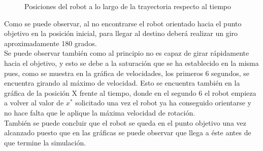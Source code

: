 \documentclass[a4paper,twoside]{article}
\begin{document}
\begin{itemize}
\begin{figure}[h!]
		\caption{Posiciones del robot a lo largo de la trayectoria respecto al tiempo}
		\end{figure}
\newpage
		Como se puede observar, al no encontrarse el robot orientado hacia el punto objetivo en la posición inicial, para llegar al destino deberá realizar un giro aproximadamente 180 grados.\\
		Se puede observar también como al principio no es capaz de girar rápidamente hacia el objetivo, y esto se debe a la saturación que se ha establecido en la misma pues, como se muestra en la gráfica de velocidades, los primeros 6 segundos, se encuentra girando al máximo de velocidad. Esto se encuentra también en la gráfica de la posición X frente al tiempo, donde en el segundo 6 el robot empieza a volver al valor de $x^*$ solicitado una vez el robot ya ha conseguido orientarse y no hace falta que le aplique la máxima velocidad de rotación.\\
		También se puede concluir que el robot se queda en el punto objetivo una vez alcanzado puesto que en las gráficas se puede observar que llega a éste antes de que termine la simulación.
		

\end{itemize}
\end{document}
